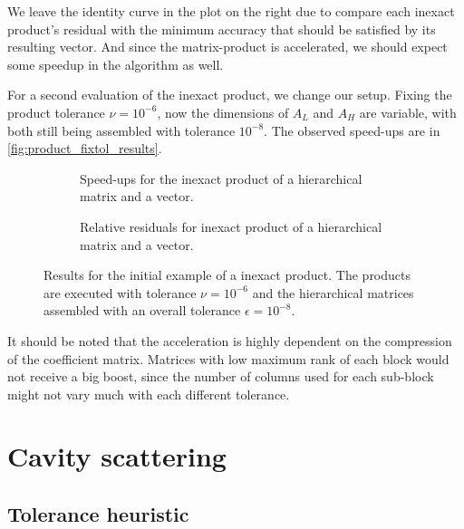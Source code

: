 We leave the identity curve in the plot on the right due to compare each inexact product's residual with the minimum accuracy that should be satisfied by its resulting vector. And since the matrix-product is accelerated, we should expect some speedup in the algorithm as well.

For a second evaluation of the inexact product, we change our setup. Fixing the product tolerance $\nu=10^{-6}$, now the dimensions of $A_{L}$ and $A_{H}$ are variable, with both still being assembled with tolerance $10^{-8}$. The observed speed-ups are in \autoref{fig:product_fixtol_results}.

\begin{figure}[h!]
    \centering
    \begin{subfigure}[b]{0.45\linewidth}
        
        \caption{Speed-ups for the inexact product of a hierarchical matrix and a vector.}
    \end{subfigure}
    \begin{subfigure}[b]{0.45\linewidth}
        
        \caption{Relative residuals for inexact product of a hierarchical matrix and a vector.}
    \end{subfigure}
    \caption{Results for the initial example of a inexact product. The products are executed with tolerance $\nu=10^{-6}$ and the hierarchical matrices assembled with an overall tolerance $\epsilon = 10^{-8}$.}
    \label{fig:product_fixtol_results}
\end{figure}


It should be noted that the acceleration is highly dependent on the compression of the coefficient matrix. Matrices with low maximum rank of each block would not receive a big boost, since the number of columns used for each sub-block might not vary much with each different tolerance.



\section{Cavity scattering}

\subsection{Tolerance heuristic}

